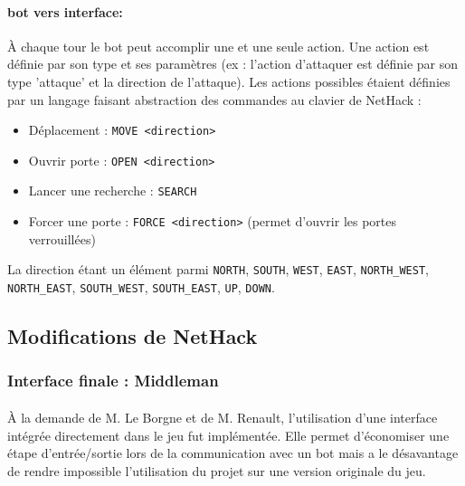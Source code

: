 \documentclass[a4paper,12pt]{article}
\begin{document}
\paragraph{bot vers interface:} À chaque tour le bot peut accomplir une et une
seule action. Une action est définie par son type et ses paramètres (ex :
l'action d'attaquer est définie par son type 'attaque' et la direction de
l'attaque). Les actions possibles étaient définies par un langage faisant
abstraction des commandes au clavier de NetHack :
\begin{itemize}
	\item Déplacement : \verb!MOVE <direction>!
	\item Ouvrir porte : \verb!OPEN <direction>!
	\item Lancer une recherche : \verb!SEARCH!
	\item Forcer une porte : \verb!FORCE <direction>! (permet d'ouvrir les portes verrouillées)
\end{itemize}
\noindent La direction étant un élément parmi \verb!NORTH!, \verb!SOUTH!,
\verb!WEST!, \verb!EAST!, \verb!NORTH_WEST!, \verb!NORTH_EAST!,
\verb!SOUTH_WEST!, \verb!SOUTH_EAST!, \verb!UP!, \verb!DOWN!.


\subsection{Modifications de NetHack}

\subsubsection{Interface finale : Middleman}

\paragraph{}À la demande de M. Le Borgne et de M. Renault,
l'utilisation d'une interface intégrée directement dans le jeu fut
implémentée. Elle permet d'économiser une étape d'entrée/sortie lors de la
communication avec un bot mais a le désavantage de rendre impossible
l'utilisation du projet sur une version originale du jeu.
\end{document}
